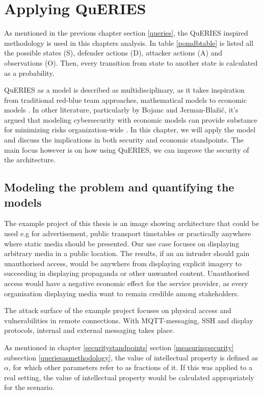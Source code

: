 \chapter{Applying QuERIES} \label{analysis}

As mentioned in the previous chapter section \ref{queries}, the
QuERIES inspired methodology is used in this chapters analysis. In
table \ref{pomdbtable} is listed all the possible states (S), defender
actions (D), attacker actions (A) and observations (O). Then, every
transition from state to another state is calculated as a probability.

QuERIES as a model is described as multidisciplinary, as it takes
inspiration from traditional red-blue team approaches, mathematical
models to economic models \cite{hughes2013quantitative}. In other
literature, particularly by Bojanc and Jerman-Blažič, it's argued that
modeling cybersecurity with economic models can provide substance for
minimizing risks organization-wide \cite{jerman2008economic}. In this
chapter, we will apply the model and discuss the implications in both
security and economic standpoints. The main focus however is on how
using QuERIES, we can improve the security of the architecture.


\section{Modeling the problem and quantifying the models} \label{modprob}

The example project of this thesis is an image showing architecture that
could be used e.g for advertisement, public transport timetables or
practically anywhere where static media should be presented. Our use
case focuses on displaying arbitrary media in a public location. The
results, if an an intruder should gain unauthorised access, would be
anywhere from displaying explicit imagery to succeeding in displaying
propaganda or other unwanted content. Unauthorised access would have a
negative economic effect for the service provider, as every
organisation displaying media want to remain credible among
stakeholders.

The attack surface of the example project focuses on physical access
and vulnerabilities in remote connections. With MQTT-messaging, SSH
and display protocols, internal and external messaging takes place.

As mentioned in chapter \ref{securitystandpoints} section
\ref{measuringsecurity} subsection \ref{queriesasmethodology}, the
value of intellectual property is defined as $\alpha$, for which other
parameters refer to as fractions of it. If this was applied to a real
setting, the value of intellectual property would be calculated
appropriately for the scenario.

